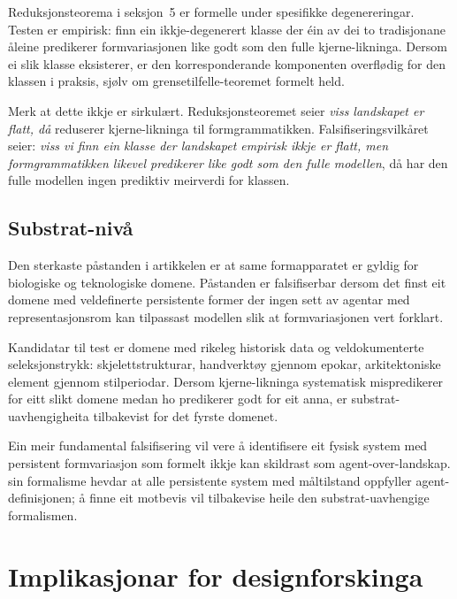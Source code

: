 \documentclass[11pt,a4paper]{article}
\begin{document}
Reduksjonsteorema i seksjon~5 er formelle under spesifikke degenereringar. Testen er empirisk: finn ein ikkje-degenerert klasse der éin av dei to tradisjonane åleine predikerer formvariasjonen like godt som den fulle kjerne-likninga. Dersom ei slik klasse eksisterer, er den korresponderande komponenten overflødig for den klassen i praksis, sjølv om grensetilfelle-teoremet formelt held.

Merk at dette ikkje er sirkulært. Reduksjonsteoremet seier \textit{viss landskapet er flatt, då} reduserer kjerne-likninga til formgrammatikken. Falsifiseringsvilkåret seier: \textit{viss vi finn ein klasse der landskapet empirisk ikkje er flatt, men formgrammatikken likevel predikerer like godt som den fulle modellen}, då har den fulle modellen ingen prediktiv meirverdi for klassen.

\subsection{Substrat-nivå}

Den sterkaste påstanden i artikkelen er at same formapparatet er gyldig for biologiske og teknologiske domene. Påstanden er falsifiserbar dersom det finst eit domene med veldefinerte persistente former der ingen sett av agentar med representasjonsrom kan tilpassast modellen slik at formvariasjonen vert forklart.

Kandidatar til test er domene med rikeleg historisk data og veldokumenterte seleksjonstrykk: skjelettstrukturar, handverktøy gjennom epokar, arkitektoniske element gjennom stilperiodar. Dersom kjerne-likninga systematisk mispredikerer for eitt slikt domene medan ho predikerer godt for eit anna, er substrat-uavhengigheita tilbakevist for det fyrste domenet.

Ein meir fundamental falsifisering vil vere å identifisere eit fysisk system med persistent formvariasjon som formelt ikkje kan skildrast som agent-over-landskap. \citet{fieldslevin2022} sin formalisme hevdar at alle persistente system med måltilstand oppfyller agent-definisjonen; å finne eit motbevis vil tilbakevise heile den substrat-uavhengige formalismen.

\section{Implikasjonar for designforskinga}
\end{document}
